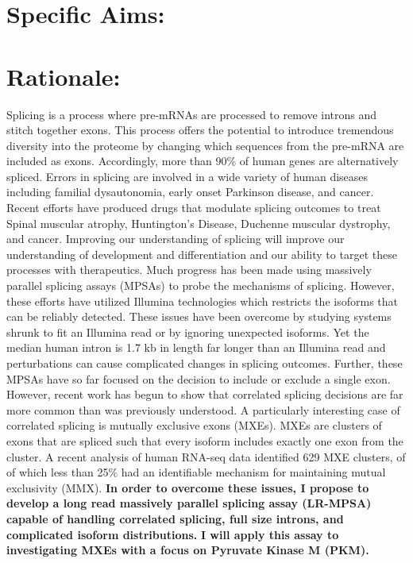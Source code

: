 \documentclass{article}
\begin{document}
\section*{Specific Aims:}
%
\section*{Rationale: } 
Splicing is a process where pre-mRNAs are processed to remove introns and stitch together exons. 
This process offers the potential to introduce tremendous diversity into the proteome by changing which sequences from the pre-mRNA are included as exons.
Accordingly, more than 90\% of human genes are alternatively spliced.\supercite{Wang2008-ej} 
Errors in splicing are involved in a wide variety of human diseases including familial dysautonomia, early onset Parkinson disease, and cancer.\supercite{Scotti2015-yp} 
Recent efforts have produced drugs that modulate splicing outcomes to treat Spinal muscular atrophy, Huntington's Disease, Duchenne muscular dystrophy, and cancer.\supercite{Neil2022-vf}
Improving our understanding of splicing will improve our understanding of development and differentiation and our ability to target these processes with therapeutics.
Much progress has been made using massively parallel splicing assays (MPSAs) to probe the mechanisms of splicing.\supercite{Ke2018-af, Julien2016-wa, Adamson2018-va, Soemedi2017-pz, Cortes-Lopez2022-gy, Schirman2021-ss, Mikl2019-ng, Braun2018-mb, Soucek2019-iq, Baeza-Centurion2020-tn, Cheung2019-ah, Baeza-Centurion2019-hz, Rosenberg2015-zs, Wong2018-vq} 
However, these efforts have utilized Illumina technologies which restricts the isoforms that can be reliably detected.
These issues have been overcome by studying systems shrunk to fit an Illumina read or by ignoring unexpected isoforms.
Yet the median human intron is 1.7 kb in length\supercite{Piovesan2019-rp} far longer than an Illumina read and perturbations can cause complicated changes in splicing outcomes.\supercite{Cortes-Lopez2022-gy,Wang2012-dr,Mathur2019-hy}
Further, these MPSAs have so far focused on the decision to include or exclude a single exon.
However, recent work has begun to show that correlated splicing decisions are far more common than was previously understood.\supercite{Zhu2021-fs, Tilgner2015-sb, Hatje2017-oj,Tilgner2018-jo} 
A particularly interesting case of correlated splicing is mutually exclusive exons (MXEs). 
MXEs are clusters of exons that are spliced such that every isoform includes exactly one exon from the cluster. 
A recent analysis of human RNA-seq data identified 629 MXE clusters, of of which less than 25\% had an identifiable mechanism for maintaining mutual exclusivity (MMX).\supercite{Hatje2017-oj} 
\textbf{In order to overcome these issues, I propose to develop a long read massively parallel splicing assay (LR-MPSA) capable of handling correlated splicing, full size introns, and complicated isoform distributions.} 
\textbf{I will apply this assay to investigating MXEs with a focus on Pyruvate Kinase M (PKM).} 
\\
\end{document}
